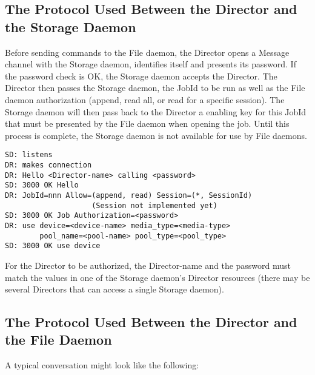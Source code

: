 \subsection*{The Protocol Used Between the Director and the Storage Daemon}

Before sending commands to the File daemon, the Director opens a Message
channel with the Storage daemon, identifies itself and presents its password.
If the password check is OK, the Storage daemon accepts the Director. The
Director then passes the Storage daemon, the JobId to be run as well as the
File daemon authorization (append, read all, or read for a specific session).
The Storage daemon will then pass back to the Director a enabling key for this
JobId that must be presented by the File daemon when opening the job. Until
this process is complete, the Storage daemon is not available for use by File
daemons. 

\footnotesize
\begin{verbatim}
SD: listens
DR: makes connection
DR: Hello <Director-name> calling <password>
SD: 3000 OK Hello
DR: JobId=nnn Allow=(append, read) Session=(*, SessionId)
                    (Session not implemented yet)
SD: 3000 OK Job Authorization=<password>
DR: use device=<device-name> media_type=<media-type>
        pool_name=<pool-name> pool_type=<pool_type>
SD: 3000 OK use device
\end{verbatim}
\normalsize

For the Director to be authorized, the \lt{}Director-name\gt{} and the
\lt{}password\gt{} must match the values in one of the Storage daemon's
Director resources (there may be several Directors that can access a single
Storage daemon). 

\subsection*{The Protocol Used Between the Director and the File Daemon}

A typical conversation might look like the following: 


